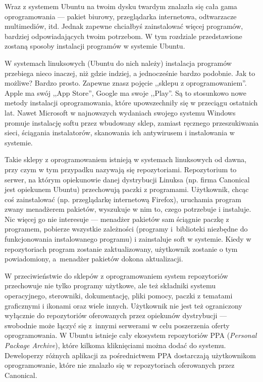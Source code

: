 \label{instalacja_oprogramowania}Wraz z systemem Ubuntu na twoim dysku twardym znalazła się cała gama oprogramowania --- pakiet biurowy, przeglądarka internetowa, odtwarzacze multimediów, itd. Jednak zapewne chciałbyś zainstalować więcej programów, bardziej odpowiadających twoim potrzebom. W tym rozdziale przedstawione zostaną sposoby instalacji programów w systemie Ubuntu.

W systemach linuksowych (Ubuntu do nich należy) instalacja programów przebiega nieco inaczej, niż gdzie indziej, a jednocześnie bardzo podobnie. Jak to możliwe? Bardzo prosto. Zapewne znasz pojęcie ,,sklepu z oprogramowaniem''. Apple ma swój ,,App Store'', Google ma swoje ,,Play''. Są to stosunkowo nowe metody instalacji oprogramowania, które upowszechniły się w przeciągu ostatnich lat. Nawet Microsoft w najnowszych wydaniach swojego systemu Windows promuje instalację softu przez wbudowany sklep, zamiast ręcznego przeszukiwania sieci, ściągania instalatorów, skanowania ich antywirusem i instalowania w systemie.

Takie sklepy z oprogramowaniem istnieją w systemach linuksowych od dawna, przy czym w tym przypadku nazywają się \textcolor{ubuntu_orange}{repozytoriami}. Repozytorium to serwer, na którym opiekunowie danej dystrybucji Linuksa (np. firma Canonical jest opiekunem Ubuntu) przechowują paczki z programami. Użytkownik, chcąc coś zainstalować (np. przeglądarkę internetową Firefox), uruchamia program zwany \textcolor{ubuntu_orange}{menadżerem pakietów}, wyszukuje w nim to, czego potrzebuje i instaluje. Nic więcej go nie interesuje --- menadżer pakietów sam ściągnie paczkę z programem, pobierze wszystkie zależności (programy i~biblioteki niezbędne do funkcjonowania instalowanego programu) i zainstaluje soft w systemie. Kiedy w repozytoriach program zostanie zaktualizowany, użytkownik zostanie o tym powiadomiony, a~menadżer pakietów dokona aktualizacji.

W przeciwieństwie do sklepów z oprogramowaniem system repozytoriów przechowuje nie tylko programy użytkowe, ale też składniki systemu operacyjnego, sterowniki, dokumentację, pliki pomocy, paczki z tematami graficznymi i ikonami oraz wiele innych. Użytkownik nie jest też ograniczony wyłącznie do repozytoriów oferowanych przez opiekunów dystrybucji --- swobodnie może łączyć się z~innymi serwerami w celu poszerzenia oferty oprogramowania. W Ubuntu istnieje cały ekosystem repozytoriów PPA (\textit{Personal Package Archive}), które kilkoma kliknięciami można dodać do systemu. Deweloperzy różnych aplikacji za pośrednictwem PPA dostarczają użytkownikom oprogramowanie, które nie znalazło się w repozytoriach oferowanych przez Canonical.

